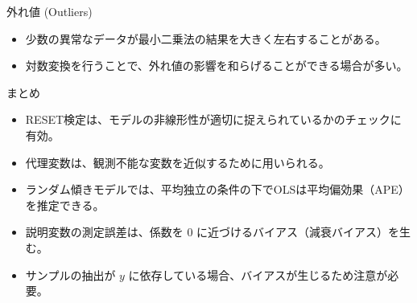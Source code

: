\documentclass[
  ignorenonframetext,
]{beamer}
\providecommand{\tightlist}{%
  \setlength{\itemsep}{0pt}\setlength{\parskip}{0pt}}
\begin{document}
\begin{frame}{外れ値 (Outliers)}
\label{ux5916ux308cux5024-outliers}
\begin{itemize}
\tightlist
\item
  少数の異常なデータが最小二乗法の結果を大きく左右することがある。
\item
  対数変換を行うことで、外れ値の影響を和らげることができる場合が多い。
\end{itemize}
\end{frame}

\begin{frame}{まとめ}
\label{ux307eux3068ux3081}
\begin{itemize}
\tightlist
\item
  RESET検定は、モデルの非線形性が適切に捉えられているかのチェックに有効。
\item
  代理変数は、観測不能な変数を近似するために用いられる。
\item
  ランダム傾きモデルでは、平均独立の条件の下でOLSは平均偏効果（APE）を推定できる。
\item
  説明変数の測定誤差は、係数を 0
  に近づけるバイアス（減衰バイアス）を生む。
\item
  サンプルの抽出が \(y\)
  に依存している場合、バイアスが生じるため注意が必要。
\end{itemize}
\end{frame}
\end{document}

